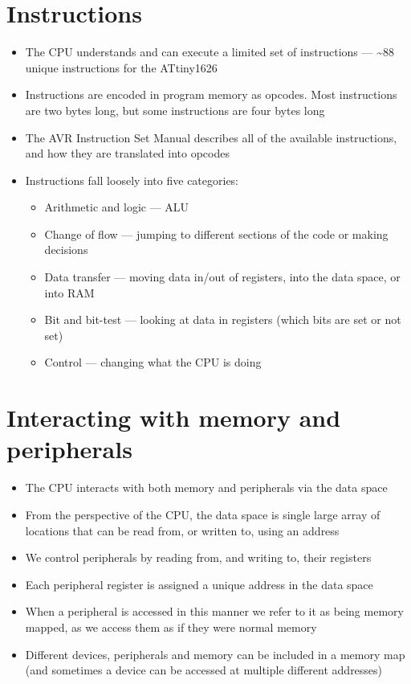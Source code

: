\documentclass{report}
\begin{document}
\section{Instructions}
\begin{itemize}
    \item The CPU understands and can execute a limited set of
          instructions --- \textasciitilde88 unique instructions for
          the ATtiny1626
    \item Instructions are encoded in program memory as opcodes. Most
          instructions are two bytes long, but some instructions are
          four bytes long
    \item The AVR Instruction Set Manual describes all of the available
          instructions, and how they are translated into opcodes
    \item Instructions fall loosely into five categories:
          \begin{itemize}
              \item Arithmetic and logic --- ALU
              \item Change of flow --- jumping to different sections of
                    the code or making decisions
              \item Data transfer --- moving data in/out of registers,
                    into the data space, or into RAM
              \item Bit and bit-test --- looking at data in registers
                    (which bits are set or not set)
              \item Control --- changing what the CPU is doing
          \end{itemize}
\end{itemize}
\section{Interacting with memory and peripherals}
\begin{itemize}
    \item The CPU interacts with both memory and peripherals via the
          data space
    \item From the perspective of the CPU, the data space is single
          large array of locations that can be read from, or written
          to, using an address
    \item We control peripherals by reading from, and writing to, their
          registers
    \item Each peripheral register is assigned a unique address in the
          data space
    \item When a peripheral is accessed in this manner we refer to it
          as being memory mapped, as we access them as if they were
          normal memory
    \item Different devices, peripherals and memory can be included in
          a memory map (and sometimes a device can be accessed at
          multiple different addresses)
\end{itemize}
\end{document}
